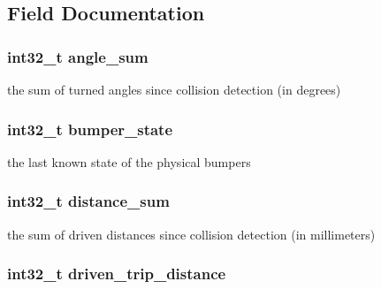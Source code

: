 \subsection{\-Field \-Documentation}
\hypertarget{structcollision__data_a7b6969b715149f30de60681a139e467f}{
\subsubsection[{angle\-\_\-sum}]{\setlength{\rightskip}{0pt plus 5cm}int32\-\_\-t {\bf angle\-\_\-sum}}}\label{structcollision__data_a7b6969b715149f30de60681a139e467f}
the sum of turned angles since collision detection (in degrees) \hypertarget{structcollision__data_a2d865c62fc673dffe7dd64d7c49c2d95}{
\subsubsection[{bumper\-\_\-state}]{\setlength{\rightskip}{0pt plus 5cm}int32\-\_\-t {\bf bumper\-\_\-state}}}\label{structcollision__data_a2d865c62fc673dffe7dd64d7c49c2d95}
the last known state of the physical bumpers \hypertarget{structcollision__data_a5d82d80b71d7c0371fbc631ae4944b86}{
\subsubsection[{distance\-\_\-sum}]{\setlength{\rightskip}{0pt plus 5cm}int32\-\_\-t {\bf distance\-\_\-sum}}}\label{structcollision__data_a5d82d80b71d7c0371fbc631ae4944b86}
the sum of driven distances since collision detection (in millimeters) \hypertarget{structcollision__data_a3dce872c749367a7762bdde1f33f639c}{
\subsubsection[{driven\-\_\-trip\-\_\-distance}]{\setlength{\rightskip}{0pt plus 5cm}int32\-\_\-t {\bf driven\-\_\-trip\-\_\-distance}}}\label{structcollision__data_a3dce872c749367a7762bdde1f33f639c}
